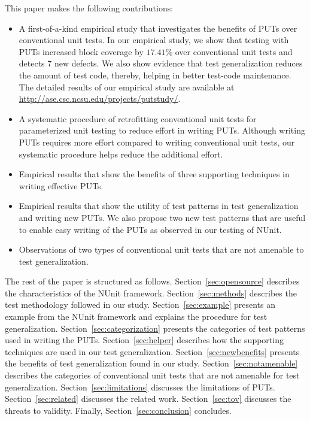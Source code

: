 This paper makes the following contributions:
\begin{itemize}
	\item A first-of-a-kind empirical study that investigates the benefits of PUTs over conventional unit tests. In our empirical study, we show that testing with PUTs increased block coverage by $17.41$\% over conventional unit tests and detects $7$ new defects. We also show evidence that test generalization reduces the amount of test code, thereby, helping in better test-code maintenance. The
detailed results of our empirical study are available at \url{http://ase.csc.ncsu.edu/projects/putstudy/}.
	\item A systematic procedure of retrofitting conventional unit tests for parameterized unit testing to reduce effort in writing PUTs. Although writing PUTs requires more effort compared to writing conventional unit tests, our systematic procedure helps reduce the additional effort.
	\item Empirical results that show the benefits of three supporting techniques in writing effective PUTs. 
	\item Empirical results that show the utility of test patterns in test generalization and writing new PUTs. We also propose two new test patterns that are useful to enable easy writing of the PUTs as observed in our testing of NUnit.
	\item Observations of two types of conventional unit tests that are not amenable to test generalization.
\end{itemize}

The rest of the paper is structured as follows. 
Section~\ref{sec:opensource} describes the characteristics of the NUnit framework. 
Section~\ref{sec:methods} describes the test methodology followed in our study. 
Section~\ref{sec:example} presents an example from the NUnit framework and explains the procedure 
for test generalization.  
Section~\ref{sec:categorization} presents the categories of test patterns used in writing the PUTs. 
Section~\ref{sec:helper} describes how the supporting techniques are used in our test generalization. 
Section~\ref{sec:newbenefits} presents the benefits of test generalization found in our study. 
Section~\ref{sec:notamenable} describes the categories of conventional unit tests that are not amenable for test generalization.
Section~\ref{sec:limitations} discusses the limitations of PUTs. Section~\ref{sec:related} discusses the related work. Section~\ref{sec:tov} discusses the threats to validity. Finally, Section~\ref{sec:conclusion} concludes.